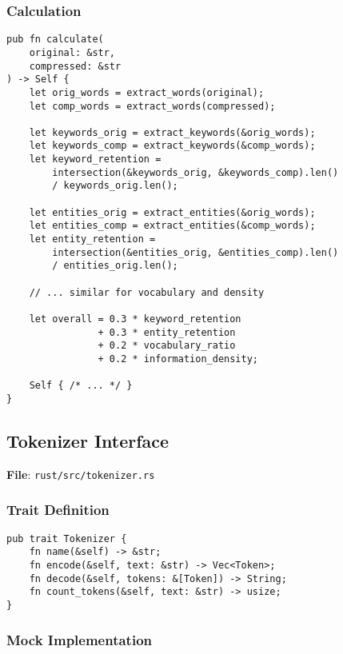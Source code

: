 \subsubsection{Calculation}

\begin{verbatim}
pub fn calculate(
    original: &str,
    compressed: &str
) -> Self {
    let orig_words = extract_words(original);
    let comp_words = extract_words(compressed);
    
    let keywords_orig = extract_keywords(&orig_words);
    let keywords_comp = extract_keywords(&comp_words);
    let keyword_retention = 
        intersection(&keywords_orig, &keywords_comp).len()
        / keywords_orig.len();
    
    let entities_orig = extract_entities(&orig_words);
    let entities_comp = extract_entities(&comp_words);
    let entity_retention = 
        intersection(&entities_orig, &entities_comp).len()
        / entities_orig.len();
    
    // ... similar for vocabulary and density
    
    let overall = 0.3 * keyword_retention
                + 0.3 * entity_retention
                + 0.2 * vocabulary_ratio
                + 0.2 * information_density;
    
    Self { /* ... */ }
}
\end{verbatim}

\subsection{Tokenizer Interface}

\textbf{File}: \texttt{rust/src/tokenizer.rs}

\subsubsection{Trait Definition}

\begin{verbatim}
pub trait Tokenizer {
    fn name(&self) -> &str;
    fn encode(&self, text: &str) -> Vec<Token>;
    fn decode(&self, tokens: &[Token]) -> String;
    fn count_tokens(&self, text: &str) -> usize;
}
\end{verbatim}

\subsubsection{Mock Implementation}

